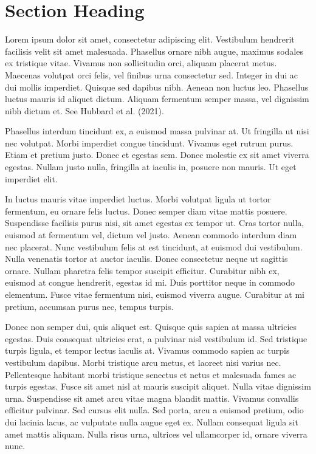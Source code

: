 \documentclass[
]{agujournal2019}
\begin{document}
\ifdefined\Shaded\renewenvironment{Shaded}{\begin{tcolorbox}[enhanced, borderline west={3pt}{0pt}{shadecolor}, breakable, boxrule=0pt, interior hidden, sharp corners, frame hidden]}{\end{tcolorbox}}\fi

\hypertarget{section-heading}{%
\section{Section Heading}\label{section-heading}}

Lorem ipsum dolor sit amet, consectetur adipiscing elit. Vestibulum
hendrerit facilisis velit sit amet malesuada. Phasellus ornare nibh
augue, maximus sodales ex tristique vitae. Vivamus non sollicitudin
orci, aliquam placerat metus. Maecenas volutpat orci felis, vel finibus
urna consectetur sed. Integer in dui ac dui mollis imperdiet. Quisque
sed dapibus nibh. Aenean non luctus leo. Phasellus luctus mauris id
aliquet dictum. Aliquam fermentum semper massa, vel dignissim nibh
dictum et. See Hubbard et al. (2021).

Phasellus interdum tincidunt ex, a euismod massa pulvinar at. Ut
fringilla ut nisi nec volutpat. Morbi imperdiet congue tincidunt.
Vivamus eget rutrum purus. Etiam et pretium justo. Donec et egestas sem.
Donec molestie ex sit amet viverra egestas. Nullam justo nulla,
fringilla at iaculis in, posuere non mauris. Ut eget imperdiet elit.

In luctus mauris vitae imperdiet luctus. Morbi volutpat ligula ut tortor
fermentum, eu ornare felis luctus. Donec semper diam vitae mattis
posuere. Suspendisse facilisis purus nisi, sit amet egestas ex tempor
ut. Cras tortor nulla, euismod at fermentum vel, dictum vel justo.
Aenean commodo interdum diam nec placerat. Nunc vestibulum felis at est
tincidunt, at euismod dui vestibulum. Nulla venenatis tortor at auctor
iaculis. Donec consectetur neque ut sagittis ornare. Nullam pharetra
felis tempor suscipit efficitur. Curabitur nibh ex, euismod at congue
hendrerit, egestas id mi. Duis porttitor neque in commodo elementum.
Fusce vitae fermentum nisi, euismod viverra augue. Curabitur at mi
pretium, accumsan purus nec, tempus turpis.

Donec non semper dui, quis aliquet est. Quisque quis sapien at massa
ultricies egestas. Duis consequat ultricies erat, a pulvinar nisl
vestibulum id. Sed tristique turpis ligula, et tempor lectus iaculis at.
Vivamus commodo sapien ac turpis vestibulum dapibus. Morbi tristique
arcu metus, et laoreet nisi varius nec. Pellentesque habitant morbi
tristique senectus et netus et malesuada fames ac turpis egestas. Fusce
sit amet nisl at mauris suscipit aliquet. Nulla vitae dignissim urna.
Suspendisse sit amet arcu vitae magna blandit mattis. Vivamus convallis
efficitur pulvinar. Sed cursus elit nulla. Sed porta, arcu a euismod
pretium, odio dui lacinia lacus, ac vulputate nulla augue eget ex.
Nullam consequat ligula sit amet mattis aliquam. Nulla risus urna,
ultrices vel ullamcorper id, ornare viverra nunc.
\end{document}
